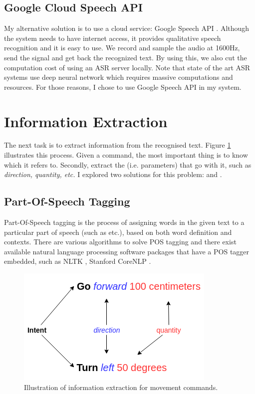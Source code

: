 \subsection{Google Cloud Speech API}
My alternative solution is to use a cloud service: Google Speech API \cite{GoogleCloud:2017}. Although the system needs to have internet access, it provides qualitative speech recognition and it is easy to use. We record and sample the audio at 1600Hz, send the signal and get back the recognized text. By using this, we also cut the computation cost of using an ASR server locally. Note that state of the art ASR systems use deep neural network which requires massive computations and resources. For those reasons, I chose to use Google Speech API in my system.

\section{Information Extraction}
\label{sec:InfoExt}
The next task is to extract information from the recognised text. Figure \ref{fig:InfoExt} illustrates this process. Given a command, the most important thing is to know which  it refers to. Secondly, extract the  (i.e. parameters) that go with it, such as \textit{direction, quantity, etc.} I explored two solutions for this problem:  and .

\subsection{Part-Of-Speech Tagging}
Part-Of-Speech tagging is the process of assigning words in the given text to a particular part of speech (such as  etc.), based on both word definition and contexts. There are various algorithms to solve POS tagging \cite{Jurafsky:2009:SLP:1214993} and there exist available natural language processing software packages that have a POS tagger embedded, such as NLTK \cite{Loper:2002:NNL:1118108.1118117}, Stanford CoreNLP \cite{manning-EtAl:2014:P14-5}. 

\begin{figure}[tb]
	\centering
	\includegraphics[width=0.6\hsize]{./figures/InfoExt}
	\caption{Illustration of information extraction for movement commands.}
	\label{fig:InfoExt}
\end{figure}


